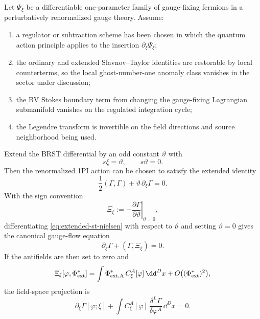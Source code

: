 \begin{theorem}
\label{thm:nielsen-identity-bv-gauge-flow}
Let \(\Psi_\xi\) be a differentiable one-parameter family of gauge-fixing
fermions in a perturbatively renormalized gauge theory.  Assume:
\begin{enumerate}
\item a regulator or subtraction scheme has been chosen in which the quantum
      action principle applies to the insertion \(\partial_\xi\Psi_\xi\);
\item the ordinary and extended Slavnov--Taylor identities are restorable by
      local counterterms, so the local ghost-number-one anomaly class
      vanishes in the sector under discussion;
\item the BV Stokes boundary term from changing the gauge-fixing Lagrangian
      submanifold vanishes on the regulated integration cycle;
\item the Legendre transform is invertible on the field directions and source
      neighborhood being used.
\end{enumerate}
Extend the BRST differential by an odd constant \(\vartheta\) with
\[
  s\xi=\vartheta,\qquad s\vartheta=0 .
\]
Then the renormalized 1PI action can be chosen to satisfy the extended
identity
\begin{equation}
  \frac12(\Gamma,\Gamma)+\vartheta\,\partial_\xi\Gamma=0 .
  \label{eq:extended-st-nielsen}
\end{equation}
With the sign convention
\[
  \Xi_\xi:=
  -\left.\frac{\partial\Gamma}{\partial\vartheta}\right|_{\vartheta=0},
\]
differentiating \eqref{eq:extended-st-nielsen} with respect to
\(\vartheta\) and setting \(\vartheta=0\) gives the canonical gauge-flow
equation
\begin{equation}
  \partial_\xi\Gamma+(\Gamma,\Xi_\xi)=0 .
  \label{eq:nielsen-canonical-flow}
\end{equation}
If the antifields are then set to zero and
\[
  \Xi_\xi[\varphi,\Phi^*_{\rm ext}]
  =
  \int \Phi^*_{\rm ext,A}\,
       C_\xi^A[\varphi]\,\dd^D x
  +O\bigl((\Phi^*_{\rm ext})^2\bigr),
\]
the field-space projection is
\begin{equation}
  \partial_\xi\Gamma[\varphi;\xi]
  +
  \int C_\xi^A[\varphi]\,
       \frac{\delta^L\Gamma}{\delta\varphi^A}\,\dd^D x
  =
  0 .
  \label{eq:nielsen-identity-1pi}
\end{equation}
\end{theorem}

